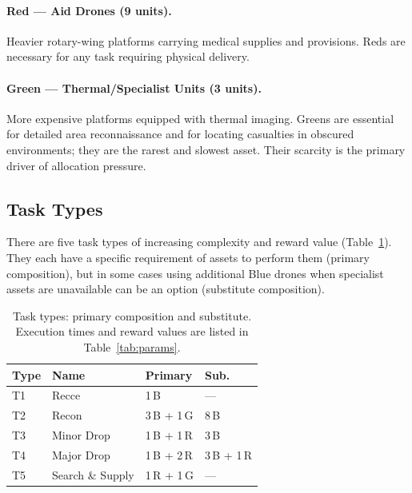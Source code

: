 \documentclass[10pt]{article}
\theoremstyle{definition}
\begin{document}
\paragraph{Red --- Aid Drones (9 units).}
Heavier rotary-wing platforms carrying medical supplies and provisions. Reds are necessary for any task requiring physical delivery.

\paragraph{Green --- Thermal/Specialist Units (3 units).}
More expensive platforms equipped with thermal imaging. Greens are essential for detailed area reconnaissance and for locating casualties in obscured environments; they are the rarest and slowest asset. Their scarcity is the primary driver of allocation pressure.

\subsection{Task Types}\label{sec:tasks}

There are five task types of increasing complexity and reward value (Table~\ref{tab:tasks}). They each have a specific requirement of assets to perform them (primary composition), but in some cases using additional Blue drones when specialist assets are unavailable can be an option (substitute composition).

\begin{table}[H]
\centering
\caption{Task types: primary composition and substitute. Execution times and reward values are listed in Table~\ref{tab:params}.}
\label{tab:tasks}
\small
\renewcommand{\arraystretch}{1.2}
\begin{tabular}{llll}
\toprule
\textbf{Type} & \textbf{Name} & \textbf{Primary} & \textbf{Sub.} \\
\midrule
T1 & Recce          & 1\,B             & ---           \\
T2 & Recon          & 3\,B + 1\,G      & 8\,B          \\
T3 & Minor Drop     & 1\,B + 1\,R      & 3\,B          \\
T4 & Major Drop     & 1\,B + 2\,R      & 3\,B + 1\,R   \\
T5 & Search \& Supply & 1\,R + 1\,G   & ---           \\
\bottomrule
\end{tabular}
\end{table}
\end{document}
